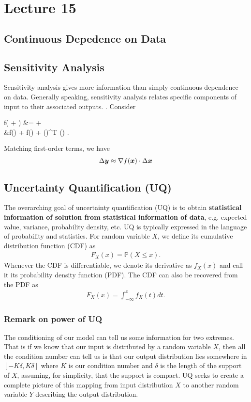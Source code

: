 \chapter{Lecture 15}
\section{Continuous Depedence on Data}

\section{Sensitivity Analysis}
Sensitivity analysis gives more information than simply continuous dependence on data. Generally speaking, sensitivity analysis relates specific components of input to their associated outputs. . Consider
\begin{ceqn} \label{eqn:15:sensitive}
    f( + \Delta {}) &=  + \Delta {} \\
    &\approx f() + \nabla f() \cdot \Delta {} + (\Delta {})^{T} () \Delta {}.
\end{ceqn}
Matching first-order terms, we have
\begin{align} \label{eqn:15:firstorderperturb}
\Delta \boldsymbol{y} \approx \nabla f(\boldsymbol{x}) \cdot \Delta \boldsymbol{x}
\end{align}

\section{Uncertainty Quantification (UQ)}
The overarching goal of uncertainty quantification (UQ) is to obtain \textbf{statistical information of solution from statistical information of data}, e.g. expected value, variance, probability density, etc. UQ is typically expressed in the language of probability and statistics. For random variable $X$, we define its cumulative distribution function (CDF) as 
\begin{align} \label{eqn:15:cdf}
    F_{X}(x) = \mathbb{P}(X \leq x).
\end{align}
Whenever the CDF is differentiable, we denote its derivative as $f_{X}(x)$ and call it its probability density function (PDF). The CDF can also be recovered from the PDF as
\begin{align}
F_{X}(x) = \int_{-\infty}^{x} f_{X}(t) dt.
\end{align}

\subsection{Remark on power of UQ}
The conditioning of our model can tell us some information for two extremes. That is if we know that our input is distributed by a random variable $X$, then all the condition number can tell us is that our output distribution lies somewhere in $[-K \delta, K \delta]$ where $K$ is our condition number and $\delta$ is the length of the support of $X$, assuming, for simplicity, that the support is compact. UQ seeks to create a complete picture of this mapping from input distribution $X$ to another random variable $Y$ describing the output distribution.


